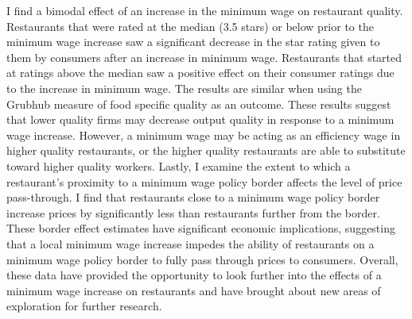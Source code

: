 \documentclass[11pt]{article}
\begin{document}
 I find a bimodal effect of an increase in the minimum wage on restaurant quality. Restaurants that were rated at the median (3.5 stars) or below  prior to the minimum wage increase saw a significant decrease in the star rating given to them by consumers after an increase in minimum wage. Restaurants that started at ratings above the median saw a positive effect on their consumer ratings due to the increase in minimum wage. The results are similar when using the Grubhub measure of food specific quality as an outcome. These results suggest that lower quality firms may decrease output quality in response to a minimum wage increase. However, a minimum wage may be acting as an efficiency wage in higher quality restaurants, or the higher quality restaurants are able to substitute toward higher quality workers.  
Lastly, I examine the extent to which a restaurant's proximity to a minimum wage policy border affects the level of price pass-through. I find that restaurants close to a minimum wage policy border increase prices by significantly less than restaurants further from the border. These border effect estimates have significant economic implications, suggesting that a local minimum wage increase impedes the ability of restaurants on a minimum wage policy border to fully pass through prices to consumers. Overall, these data have provided the opportunity to look further into the effects of a minimum wage increase on restaurants and have brought about new areas of exploration for further research.
\end{document}
